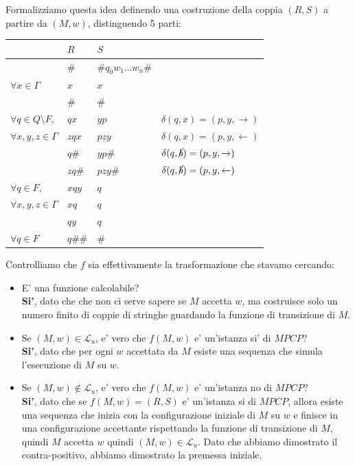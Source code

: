 Formalizziamo questa idea definendo una costruzione della coppia $ (R,S) $ a partire da $ (M,w) $, distinguendo 5 parti:
\begin{center}
  \begin{tabular}{ll|ll}
    &$ R $ & $ S $ & \\ \hline
    &$ \# $ & $ \# q_0 w_1...w_n \#$ & \\ \hline
    $ \forall x \in \Gamma $&$ x $ & $ x $ & \\
    &$ \# $ & $ \# $ &\\ \hline
    $ \forall q \in Q \setminus F, $&$ qx $ & $ yp $ & $ \delta (q,x) = (p, y, \to) $\\
    $ \forall x,y,z \in \Gamma $&$ zqx $ & $ pzy $ & $ \delta (q,x) = (p, y, \gets) $\\
    &$ q\# $ & $ yp\# $ & $ \delta (q,\cancel{b}) = (p, y, \to) $\\
    &$ zq\# $ & $ pzy\# $ & $ \delta (q,\cancel{b}) = (p, y, \gets) $\\ \hline
    $ \forall q \in F, $&$ xqy $&$ q  $&\\
    $ \forall x,y,z \in \Gamma $&$ xq $&$ q  $&\\
    &$ qy $&$ q  $&\\ \hline
    $ \forall q \in F $&$ q\#\# $&$ \#  $&
  \end{tabular}
\end{center}

Controlliamo che $ f $ sia effettivamente la trasformazione che stavamo cercando:
\begin{itemize}
\item E' una funzione calcolabile?\\
  \textbf{Si'}, dato che che non ci serve sapere se $ M $ accetta $ w $, ma costruisce solo un numero finito di coppie di stringhe guardando la funzione di transizione di $ M $.
\item Se $ (M,w) \in \mathcal{L}_u $, e' vero che $ f(M,w) $ e' un'istanza si' di $ MPCP $?\\
  \textbf{Si'}, dato che per ogni $ w $ accettata da $ M $ esiste una sequenza che simula l'esecuzione di $ M $ su $ w $.
\item Se $ (M,w) \not\in \mathcal{L}_u $, e' vero che $ f(M,w) $ e' un'istanza no di $ MPCP $?\\
  \textbf{Si'}, dato che se $ f(M,w) = (R,S) $ e' un'istanza si di $ MPCP $, allora esiste una sequenza che inizia con la configurazione iniziale di $ M $ su $ w $ e finisce in una configurazione accettante rispettando la funzione di transizione di $ M $, quindi $ M $ accetta $ w $ quindi $ (M,w) \in \mathcal{L}_u $. Dato che abbiamo dimostrato il contra-positivo, abbiamo dimostrato la premessa iniziale.
\end{itemize}

